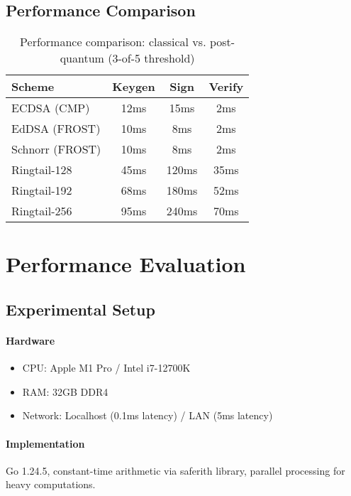 \documentclass[11pt,twocolumn]{article}
\begin{document}
\subsection{Performance Comparison}

\begin{table}[h]
\centering
\small
\begin{tabular}{@{}lccc@{}}
\toprule
\textbf{Scheme} & \textbf{Keygen} & \textbf{Sign} & \textbf{Verify} \\
\midrule
ECDSA (CMP) & 12ms & 15ms & 2ms \\
EdDSA (FROST) & 10ms & 8ms & 2ms \\
Schnorr (FROST) & 10ms & 8ms & 2ms \\
Ringtail-128 & 45ms & 120ms & 35ms \\
Ringtail-192 & 68ms & 180ms & 52ms \\
Ringtail-256 & 95ms & 240ms & 70ms \\
\bottomrule
\end{tabular}
\caption{Performance comparison: classical vs. post-quantum (3-of-5 threshold)}
\label{tab:pq_performance}
\end{table}

\section{Performance Evaluation}

\subsection{Experimental Setup}

\paragraph{Hardware}
\begin{itemize}
\item CPU: Apple M1 Pro / Intel i7-12700K
\item RAM: 32GB DDR4
\item Network: Localhost (0.1ms latency) / LAN (5ms latency)
\end{itemize}

\paragraph{Implementation} Go 1.24.5, constant-time arithmetic via saferith library, parallel processing for heavy computations.
\end{document}
